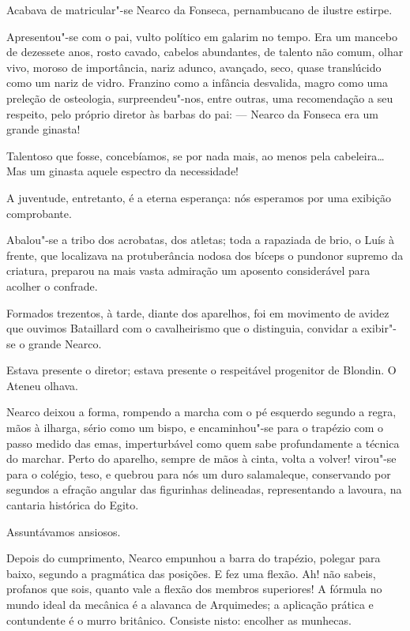 Acabava de matricular"-se Nearco da Fonseca, pernambucano de ilustre estirpe.

Apresentou"-se com o pai, vulto político em galarim no tempo. Era um
mancebo de dezessete anos, rosto cavado, cabelos abundantes, de talento
não comum, olhar vivo, moroso de importância, nariz adunco, avançado,
seco, quase translúcido como um nariz de vidro. Franzino como a
infância desvalida, magro como uma preleção de osteologia,
surpreendeu"-nos, entre outras, uma recomendação a seu respeito, pelo
próprio diretor às barbas do pai: --- Nearco da Fonseca era um grande
ginasta! 

Talentoso que fosse, concebíamos, se por nada mais, ao menos
pela cabeleira\ldots{} Mas um ginasta aquele espectro da necessidade! 

A juventude, entretanto, é a eterna esperança: nós esperamos por uma
exibição comprobante. 

Abalou"-se a tribo dos acrobatas, dos atletas;
toda a rapaziada de brio, o Luís à frente, que localizava na
protuberância nodosa dos bíceps o pundonor supremo da criatura,
preparou na mais vasta admiração um aposento considerável para acolher
o confrade. 

Formados trezentos, à tarde, diante dos aparelhos, foi em
movimento de avidez que ouvimos Bataillard com o cavalheirismo que o
distinguia, convidar a exibir"-se o grande Nearco. 

Estava presente o
diretor; estava presente o respeitável progenitor de Blondin. O Ateneu
olhava. 

Nearco deixou a forma, rompendo a marcha com o pé esquerdo
segundo a regra, mãos à ilharga, sério como um bispo, e encaminhou"-se
para o trapézio com o passo medido das emas, imperturbável 
como quem sabe profundamente a técnica do marchar. Perto
do aparelho, sempre de mãos à cinta, volta a volver! virou"-se para o
colégio, teso, e quebrou para nós um duro salamaleque, conservando por
segundos a efração angular das figurinhas delineadas, representando a
lavoura, na cantaria histórica do Egito. 

Assuntávamos ansiosos. 

Depois do cumprimento, Nearco empunhou a barra do trapézio, polegar para
baixo, segundo a pragmática das posições. E fez uma flexão. Ah! não
sabeis, profanos que sois, quanto vale a flexão dos membros superiores!
A fórmula no mundo ideal da mecânica é a alavanca de Arquimedes; a
aplicação prática e contundente é o murro britânico. Consiste nisto:
encolher as munhecas. 

